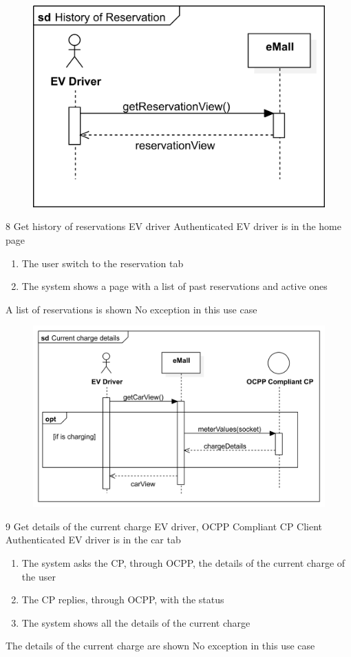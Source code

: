 \usecase
{
    \begin{figure}[H]
        \centering
        \includegraphics[scale=0.9]{src/sequence_diagram/reservationView.png}
    \end{figure}
}
{8}
{Get history of reservations}
{EV driver}
{Authenticated EV driver is in the home page}
{
    \begin{enumerate}
        \item The user switch to the reservation tab
        \item The system shows a page with a list of past reservations and active ones
    \end{enumerate}
}
{A list of reservations is shown}
{
    No exception in this use case
}
{
}

\pagebreak
\usecase
{
    \begin{figure}[H]
        \centering
        \includegraphics[scale=0.9]{src/sequence_diagram/currentChargeDetails.png}
    \end{figure}
}
{9}
{Get details of the current charge}
{EV driver, OCPP Compliant CP Client}
{Authenticated EV driver is in the car tab}
{
    \begin{enumerate}
        \item The system asks the CP, through OCPP, the details of the current charge of the user
        \item The CP replies, through OCPP, with the status
        \item The system shows all the details of the current charge
    \end{enumerate}
}
{The details of the current charge are shown}
{
    No exception in this use case
}
{
}

